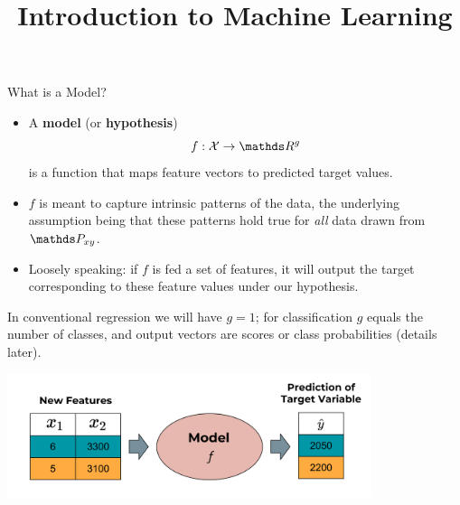 \documentclass[11pt,compress,t,notes=noshow, xcolor=table]{beamer}
\title{Introduction to Machine Learning}
\institute{\href{https://compstat-lmu.github.io/lecture_i2ml/}{compstat-lmu.github.io/lecture\_i2ml}}
\date{}
\begin{document}










\begin{vbframe}{What is a Model?}

\begin{itemize}

  \item A \textbf{model} (or \textbf{hypothesis}) 
  $$f : \Xspace \rightarrow \R^g$$ 
  is a function that maps feature vectors to predicted target values.
  
  \item $f$ is meant to capture intrinsic patterns of the data, the
  underlying assumption being that these patterns hold true for \emph{all} data 
  drawn from $\Pxy$.
  
  \item Loosely speaking: if $f$ is fed a set of features, it will output the 
  target corresponding to these feature values under our hypothesis.
  
  
\end{itemize}
  
\lz  
  
{\footnotesize In conventional regression we will have $g = 1$; for 
classification $g$ equals the number of classes, and output vectors are scores 
or class probabilities (details later).}

\framebreak

\begin{center}
  \includegraphics[width = 0.8\textwidth]{figure_man/the_model_web} 
\end{center}


\end{vbframe}
\end{document}
